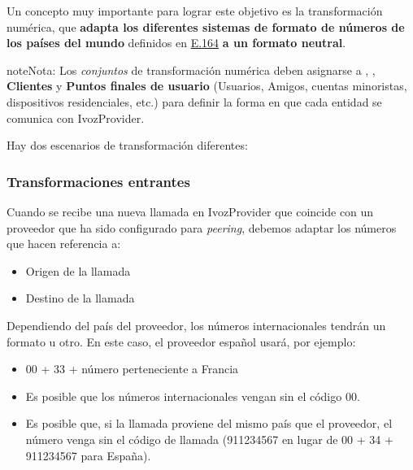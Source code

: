 \documentclass[letterpaper,10pt,spanish]{sphinxmanual}
\begin{document}
Un concepto muy importante para lograr este objetivo es la transformación numérica, que \textbf{adapta los diferentes sistemas de formato de números de los países del mundo} definidos en \href{https://www.itu.int/rec/T-REC-E.164/es}{E.164} \textbf{a un formato neutral}.

\begin{notice}{note}{Nota:}
Los \emph{conjuntos} de transformación numérica deben asignarse a {\hyperref[administration_portal/brand/providers/carriers:carriers]{}}, {\hyperref[administration_portal/brand/providers/ddi_providers:ddi\string-providers]{}}, \textbf{Clientes} y \textbf{Puntos finales de usuario} (Usuarios, Amigos, cuentas minoristas, dispositivos residenciales, etc.) para definir la forma en que cada entidad se comunica con IvozProvider.
\end{notice}

Hay dos escenarios de transformación diferentes:


\subsubsection{Transformaciones entrantes}
\label{administration_portal/brand/settings/numeric_transformations:incoming-transformations}
Cuando se recibe una nueva llamada en IvozProvider que coincide con un proveedor que ha sido configurado para \emph{peering}, debemos adaptar los números que hacen referencia a:
\begin{itemize}
\item {} 
Origen de la llamada

\item {} 
Destino de la llamada

\end{itemize}

Dependiendo del país del proveedor, los números internacionales tendrán un formato u otro. En este caso, el proveedor español usará, por ejemplo:
\begin{itemize}
\item {} 
00 + 33 + número perteneciente a Francia

\item {} 
Es posible que los números internacionales vengan sin el código 00.

\item {} 
Es posible que, si la llamada proviene del mismo país que el proveedor, el número venga sin el código de llamada (911234567 en lugar de 00 + 34 + 911234567 para España).

\end{itemize}
\end{document}
